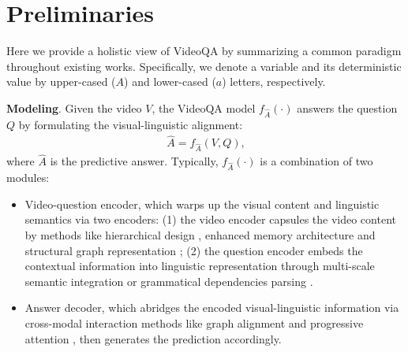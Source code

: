 \section{Preliminaries}
\label{sec:preliminaries}

Here we provide a holistic view of VideoQA by summarizing a common paradigm throughout existing works. Specifically, we denote a variable and its deterministic value by upper-cased (\eg $A$) and lower-cased (\eg $a$) letters, respectively. 

\vspace{5pt}
\noindent\textbf{Modeling}.
Given the video $V$, the VideoQA model $f_{\hat{A}}{(\cdot)}$ answers the question $Q$ by formulating the visual-linguistic alignment: 
\begin{gather}\label{eq:conventional-modeling}\
    \hat{A} = f_{\hat{A}}(V,Q),
\end{gather}
where $\hat{A}$ is the predictive answer. Typically, $f_{\hat{A}}{(\cdot)}$ is a combination of two modules: 
\begin{itemize}[leftmargin=*]
    \item Video-question encoder, which warps up the visual content and linguistic semantics via two encoders: (1) the video encoder capsules the video content by methods like hierarchical design \cite{DBLP:conf/mm/PengYBW21, dang2021hierarchical, le2021hierarchical}, enhanced memory architecture \cite{gao2018motionappearance, fan2019heterogeneous} and structural graph representation  \cite{jiang2020reasoning,huang2020locationaware,DBLP:conf/acl/GuoZJ0L20, Wang_2018_ECCV}; (2) the question encoder embeds the contextual information into linguistic representation through multi-scale semantic integration \cite{jiang2020reasoning, DBLP:conf/acl/SeoKPZ20, 2021} or grammatical dependencies parsing \cite{park2021bridge}.
    
    \item Answer decoder, which abridges the encoded visual-linguistic information via cross-modal interaction methods like graph alignment \cite{ park2021bridge} and progressive attention \cite{DBLP:conf/acl/SeoKPZ20, DBLP:conf/mm/PengYBW21}, then generates the prediction accordingly.
\end{itemize}

